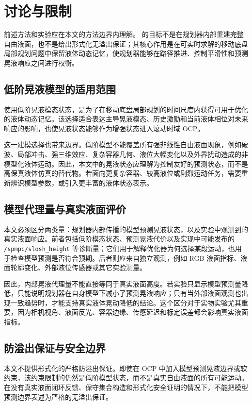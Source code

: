 \section{讨论与限制}

前述方法和实验应在本文的方法边界内理解。\SPMPC{} 的目标不是在规划器内部重建完整自由液面，也不是给出形式化无溢出保证；其核心作用是在可实时求解的移动底盘局部规划问题中保留液体动态记忆，使规划器能够在路径推进、控制平滑性和预测晃液响应之间进行权衡。

\subsection{低阶晃液模型的适用范围}

\SPMPC{} 使用低阶晃液模态状态，是为了在移动底盘局部规划的时间尺度内获得可用于优化的液体动态记忆。该选择适合表达主导晃液模态、历史激励和当前液体相位对未来响应的影响，也使晃液状态能够作为增强状态进入滚动时域 OCP。

这一建模选择也带来边界。低阶模型不能覆盖所有强非线性自由液面现象，例如破波、局部冲击、强三维效应、复杂容器几何、液位大幅变化以及外界扰动造成的非模型化液体运动。因此，本文中的晃液状态应理解为控制友好的预测状态，而不是高保真液体仿真的替代物。若面向更复杂容器、较高液位或剧烈运动任务，需要重新辨识模型参数，或引入更丰富的液体状态表示。

\subsection{模型代理量与真实液面评价}

本文必须区分两类量：规划器内部传播的模型预测晃液状态，以及实验中观测到的真实液面响应。前者包括低阶模态状态、预测晃液代价以及实现中可能发布的 \texttt{/spmpc/slosh\_height} 等诊断量；它们用于解释优化器为何选择某段运动，也用于检查模型预测是否符合预期。后者则应来自独立观测，例如 RGB 液面指标、液面轮廓变化、外部液位传感器或其它实验测量。

因此，内部晃液代理量不能直接等同于真实液面高度。若实验只显示模型预测量降低，只能说明规划器在自身模型下减小了预测晃液响应；只有当外部液面观测也出现一致趋势时，才能支持真实液体晃动降低的结论。这个区分对于实物实验尤其重要，因为相机视角、液面反光、容器边缘、传感延迟和标定误差都会影响真实液面指标。

\subsection{防溢出保证与安全边界}

本文不提供形式化的严格防溢出保证。即使在 OCP 中加入模型预测晃液边界或软约束，该约束限制的仍然是低阶模型状态，而不是真实自由液面的所有可能运动。在没有真实液面闭环反馈、保守集合构造和形式化安全证明的情况下，不能把模型预测边界表述为严格的无溢出保证。

